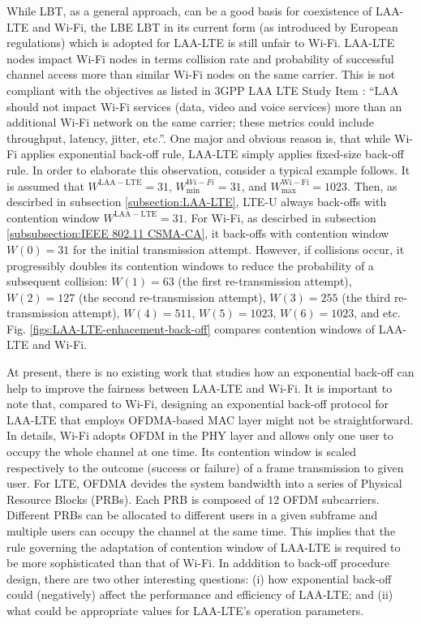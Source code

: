 \documentclass[journal,draftclsnofoot,12pt,onecolumn]{IEEEtran}
\begin{document}
While LBT, as a general approach, can be a good basis for coexistence of LAA-LTE and Wi-Fi, the LBE LBT in its current form (as introduced by European regulations) which is adopted for LAA-LTE is still unfair to Wi-Fi. LAA-LTE nodes impact Wi-Fi nodes in terms collision rate and probability of successful channel access more than similar Wi-Fi nodes on the same carrier. This is not compliant with the objectives as listed in 3GPP LAA LTE Study Item \cite{LAA-LTE-SI}: ``LAA should not impact Wi-Fi services (data, video and voice services) more than an additional Wi-Fi network on the same carrier; these metrics could include throughput, latency, jitter, etc.''. One major and obvious reason is, that while Wi-Fi applies exponential back-off rule, LAA-LTE simply applies fixed-size back-off rule. In order to elaborate this observation, consider a typical example follows. It is assumed that $W^{\mathrm{LAA-LTE}}=31$, $W^{Wi-Fi}_{\min}=31$, and $W^{\mathrm{Wi-Fi}}_{\max}=1023$. Then, as descirbed in subsection \ref{subsection:LAA-LTE}, LTE-U always back-offs with contention window $W^{\mathrm{LAA-LTE}}=31$. For Wi-Fi, as descirbed in subsection \ref{subsubsection:IEEE 802.11 CSMA-CA}, it back-offs with contention window $W(0)=31$ for the initial transmission attempt. However, if collisions occur, it progressibly doubles its contention windows to reduce the probability of a subsequent collision: $W(1)=63$ (the first re-transmission attempt), $W(2)=127$ (the second re-transmission attempt), $W(3)=255$ (the third re-transmission attempt), $W(4)=511$, $W(5)=1023$, $W(6)=1023$, and etc. Fig. \ref{figs:LAA-LTE-enhacement-back-off} compares contention windows of LAA-LTE and Wi-Fi.

At present, there is no existing work that studies how an exponential back-off can help to improve the fairness between LAA-LTE and Wi-Fi. It is important to note that, compared to Wi-Fi, designing an exponential back-off protocol for LAA-LTE that employs OFDMA-based MAC layer might not be straightforward. In details, Wi-Fi adopts OFDM in the PHY layer and allows only one user to occupy the whole channel at one time. Its contention window is scaled respectively to the outcome (success or failure) of a frame transmission to given user. For LTE, OFDMA devides the system bandwidth into a series of Physical Resource Blocks (PRBs). Each PRB is composed of $12$ OFDM subcarriers. Different PRBs can be allocated to different users in a given subframe and multiple users can occupy the channel at the same time. This implies that the rule governing the adaptation of contention window of LAA-LTE is required to be more sophisticated than that of Wi-Fi. In adddition to back-off procedure design, there are two other interesting questions: (i) how exponential back-off could (negatively) affect the performance and efficiency of LAA-LTE; and (ii) what could be appropriate values for LAA-LTE's operation parameters.
\end{document}
